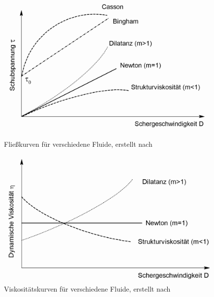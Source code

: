 \begin{figure}[h!]
	\begin{minipage}[b]{0.475\textwidth}
		\centering
		\includegraphics[width=\textwidth]{img/fluidarten}
		\caption{Fließkurven für verschiedene \linebreak Fluide, erstellt nach \cite{Holze.2010}}
		\label{fig: arten_fluide}
	\end{minipage}
	\hspace*{0.05\textwidth}
	\begin{minipage}[b]{0.475\textwidth}
		\centering
		\includegraphics[width=\textwidth]{img/fluidarten2}
		\caption{Viskositätskurven für verschiedene Fluide, erstellt nach \cite{MunzingChemieGmbH.2018}}
		\label{fig: arten_fluide2}
	\end{minipage}
\end{figure}
\FloatBarrier


